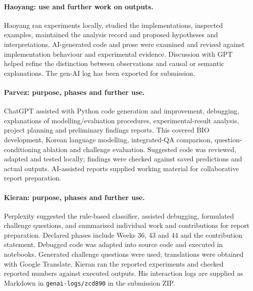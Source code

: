 \documentclass[11pt,a4paper]{article}
\begin{document}
\paragraph{Haoyang: use and further work on outputs.}
Haoyang ran experiments locally, studied the implementations, inspected
examples, maintained the analysis record and proposed hypotheses and
interpretations. AI-generated code and prose were examined and revised
against implementation behaviour and experimental evidence. Discussion
with GPT helped refine the distinction between observations and causal
or semantic explanations. The gen-AI log has been exported for submission.

\paragraph{Parvez: purpose, phases and further use.}
ChatGPT assisted with Python code generation and improvement, debugging,
explanations of modelling/evaluation procedures, experimental-result
analysis, project planning and preliminary findings reports. This covered
BIO development, Korean language modelling, integrated-QA comparison,
question-conditioning ablation and challenge evaluation. Suggested code
was reviewed, adapted and tested locally; findings were checked against
saved predictions and actual outputs. AI-assisted reports supplied
working material for collaborative report preparation.

\paragraph{Kieran: purpose, phases and further use.}
Perplexity suggested the rule-based classifier, assisted debugging,
formulated challenge questions, and summarised individual work and
contributions for report preparation. Declared phases include Weeks 36,
43 and 44 and the contribution statement. Debugged code was adapted into
source code and executed in notebooks. Generated challenge questions were
used; translations were obtained with Google Translate. Kieran ran the
reported experiments and checked reported numbers against executed
outputs. His interaction logs are supplied as Markdown in
\texttt{genai-logs/zcd890} in the submission ZIP.
\end{document}
